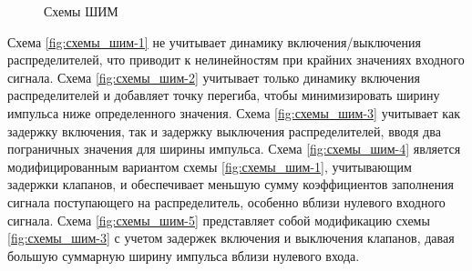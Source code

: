\begin{figure}[ht]
{{
        }
        \vfil    {}
    }
    \caption{Схемы ШИМ}\label{fig:схемы_шим}
\end{figure}

Схема \cref*{fig:схемы_шим-1} не учитывает динамику включения/выключения распределителей, что приводит к нелинейностям при
крайних значениях входного сигнала. Схема \cref*{fig:схемы_шим-2} учитывает только динамику включения распределителей и добавляет точку перегиба,
чтобы минимизировать ширину импульса ниже определенного значения. Схема \cref*{fig:схемы_шим-3} учитывает как задержку включения, так и
задержку выключения распределителей, вводя два пограничных значения для ширины импульса. Схема \cref*{fig:схемы_шим-4} является модифицированным
вариантом схемы \cref*{fig:схемы_шим-1}, учитывающим задержки клапанов, и обеспечивает меньшую сумму коэффициентов заполнения сигнала поступающего на распределитель,
особенно вблизи нулевого входного сигнала. Схема \cref*{fig:схемы_шим-5} представляет собой модификацию схемы \cref*{fig:схемы_шим-3} с
учетом задержек включения
и выключения клапанов, давая большую суммарную ширину импульса вблизи нулевого входа.

